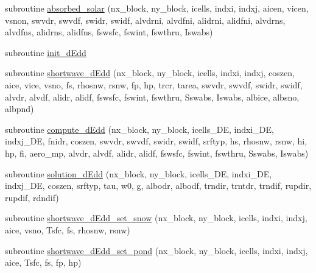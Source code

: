 \begin{DoxyCompactItemize}
subroutine \hyperlink{namespaceice__shortwave_a8e3aa5ad4b562f1a00ecb4c6e024f1b1}{absorbed\_\-solar} (nx\_\-block, ny\_\-block, icells, indxi, indxj, aicen, vicen, vsnon, swvdr, swvdf, swidr, swidf, alvdrni, alvdfni, alidrni, alidfni, alvdrns, alvdfns, alidrns, alidfns, fswsfc, fswint, fswthru, Iswabs)
\item 
subroutine \hyperlink{namespaceice__shortwave_ad9abb419b6673b90f9885b9f70a715ac}{init\_\-dEdd}
\item 
subroutine \hyperlink{namespaceice__shortwave_a628868bc140ea7881708332dd8ef24d4}{shortwave\_\-dEdd} (nx\_\-block, ny\_\-block, icells, indxi, indxj, coszen, aice, vice, vsno, fs, rhosnw, rsnw, fp, hp, trcr, tarea, swvdr, swvdf, swidr, swidf, alvdr, alvdf, alidr, alidf, fswsfc, fswint, fswthru, Sswabs, Iswabs, albice, albsno, albpnd)
\item 
subroutine \hyperlink{namespaceice__shortwave_ab654ccf63c1d24f5ce7b878325222232}{compute\_\-dEdd} (nx\_\-block, ny\_\-block, icells\_\-DE, indxi\_\-DE, indxj\_\-DE, fnidr, coszen, swvdr, swvdf, swidr, swidf, srftyp, hs, rhosnw, rsnw, hi, hp, fi, aero\_\-mp, alvdr, alvdf, alidr, alidf, fswsfc, fswint, fswthru, Sswabs, Iswabs)
\item 
subroutine \hyperlink{namespaceice__shortwave_a35b4eec6be9c5bc0bdb6a520b9f287d8}{solution\_\-dEdd} (nx\_\-block, ny\_\-block, icells\_\-DE, indxi\_\-DE, indxj\_\-DE, coszen, srftyp, tau, w0, g, albodr, albodf, trndir, trntdr, trndif, rupdir, rupdif, rdndif)
\item 
subroutine \hyperlink{namespaceice__shortwave_a6cfca7557b0dd2a30e5570b0c0d5ef36}{shortwave\_\-dEdd\_\-set\_\-snow} (nx\_\-block, ny\_\-block, icells, indxi, indxj, aice, vsno, Tsfc, fs, rhosnw, rsnw)
\item 
subroutine \hyperlink{namespaceice__shortwave_a09f51c7b0e45e37eeba70b3332d60750}{shortwave\_\-dEdd\_\-set\_\-pond} (nx\_\-block, ny\_\-block, icells, indxi, indxj, aice, Tsfc, fs, fp, hp)
\end{DoxyCompactItemize}
